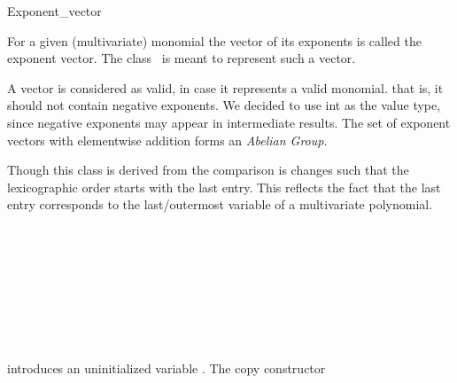 \begin{ccRefClass}{Exponent_vector}

\ccDefinition

For a given (multivariate) monomial the vector of its exponents is called the 
exponent vector. The class \ccClassName\ is meant to represent 
such a vector.

A vector is considered as valid, in case it represents a valid monomial. 
that is, it should not contain negative exponents. 
We decided to use int as the value type, 
since negative exponents may appear in intermediate results.
The set of exponent vectors with elementwise 
addition forms an {\em Abelian Group}. 

Though this class is derived from  the comparison
is changes such that the lexicographic order starts with the last entry. 
This reflects the fact that the last entry corresponds 
to the last/outermost variable of a multivariate polynomial. 




\ccInheritsFrom
{}

\ccIsModel

\\
\\

\\
\\
\\

\\
\\

\ccCreation
{}

        {introduces an uninitialized variable \ccVar.
        }\ccGlue
        {The copy constructor
        }\ccGlue


\end{ccRefClass}
